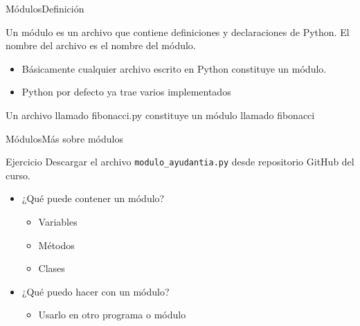 \documentclass[spanish]{beamer}
\begin{document}
\begin{frame}{Módulos}{Definición}
  \begin{definition}
    Un \alert{módulo} es un archivo que contiene definiciones y declaraciones de Python. \alert{El nombre del archivo es el nombre del módulo.}
  \end{definition}
  \pause
  \begin{itemize}
    \item Básicamente cualquier archivo escrito en Python constituye un módulo.
    \item Python por defecto ya trae varios implementados
  \end{itemize}
  \pause
  \begin{example}
    Un archivo llamado fibonacci.py constituye un módulo llamado fibonacci
  \end{example}
\end{frame}

\begin{frame}{Módulos}{Más sobre módulos}
  \begin{block}{Ejercicio}
      Descargar el archivo \texttt{modulo\_ayudantia.py} desde repositorio GitHub del curso.
  \end{block}
  
  \pause
  \begin{itemize}
    \item ¿Qué puede contener un módulo?
          \pause
          \begin{itemize}
            \item Variables
            \item Métodos
            \item Clases
          \end{itemize}
    \item ¿Qué puedo hacer con un módulo?
          \pause
          \begin{itemize}
            \item Usarlo en otro programa o módulo
          \end{itemize}
            
  \end{itemize}
    
\end{frame}
\end{document}
